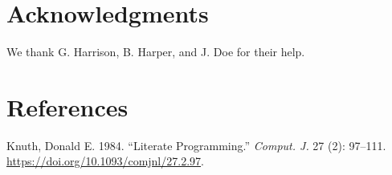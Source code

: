 \documentclass[
  oneside,
  open=any]{scrbook}
\newlength{\cslhangindent}
\newlength{\cslentryspacingunit} %
\newenvironment{CSLReferences}[2] %
 {%
  \setlength{\parindent}{0pt}
  \ifodd #1
  \let\oldpar\par
  \def\par{\hangindent=\cslhangindent\oldpar}
  \fi
  \setlength{\parskip}{#2\cslentryspacingunit}
 }%
 {}
\begin{document}
\hypertarget{acknowledgments}{%
\chapter{Acknowledgments}\label{acknowledgments}}

We thank G. Harrison, B. Harper, and J. Doe for their help.

\hypertarget{references}{%
\chapter{References}\label{references}}

\hypertarget{refs}{}
\begin{CSLReferences}{1}{0}
\leavevmode{}%
Knuth, Donald E. 1984. {``Literate Programming.''} \emph{Comput. J.} 27
(2): 97--111. \url{https://doi.org/10.1093/comjnl/27.2.97}.

\end{CSLReferences}


\backmatter
\end{document}
